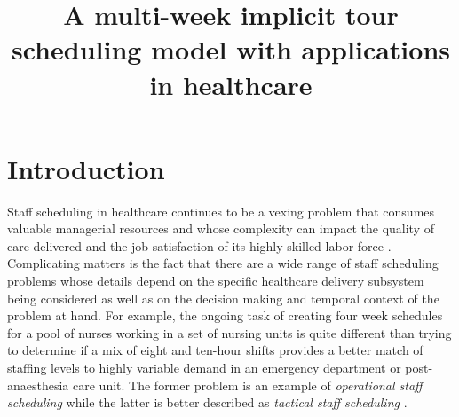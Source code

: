 \documentclass{article}
\begin{document}
\title{A multi-week implicit tour scheduling model with applications in healthcare
}


\author{
}









\section{Introduction}
\label{sec-intro}
Staff scheduling in healthcare continues to be a vexing problem that consumes valuable managerial resources and whose complexity can impact the quality of care delivered and the job satisfaction of its highly skilled labor force \cite{}. Complicating matters is the fact that there are a wide range of staff scheduling problems whose details depend on the specific healthcare delivery subsystem being considered as well as on the decision making and temporal context of the problem at hand. For example, the ongoing task of creating four week schedules for a pool of nurses working in a set of nursing units is quite different than trying to determine if a mix of eight and ten-hour shifts provides a better match of staffing levels to highly variable demand in an emergency department or post-anaesthesia care unit. The former problem is an example of \textit{operational staff scheduling} while the latter is better described as \textit{tactical staff scheduling} \cite{isken:aor2004}.
\end{document}
